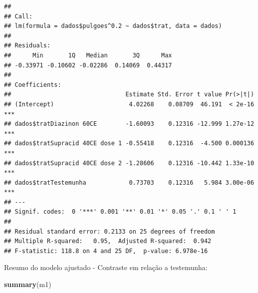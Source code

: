 \documentclass[
]{book}
\newenvironment{Shaded}{\begin{snugshade}}{\end{snugshade}}
\newcommand{\DataTypeTok}[1]{\textcolor[rgb]{0.13,0.29,0.53}{#1}}
\newcommand{\FloatTok}[1]{\textcolor[rgb]{0.00,0.00,0.81}{#1}}
\newcommand{\KeywordTok}[1]{\textcolor[rgb]{0.13,0.29,0.53}{\textbf{#1}}}
\newcommand{\NormalTok}[1]{#1}
\newcommand{\OperatorTok}[1]{\textcolor[rgb]{0.81,0.36,0.00}{\textbf{#1}}}
\newcommand{\StringTok}[1]{\textcolor[rgb]{0.31,0.60,0.02}{#1}}
\begin{document}
\begin{verbatim}
## 
## Call:
## lm(formula = dados$pulgoes^0.2 ~ dados$trat, data = dados)
## 
## Residuals:
##      Min       1Q   Median       3Q      Max 
## -0.33971 -0.10602 -0.02286  0.14069  0.44317 
## 
## Coefficients:
##                                Estimate Std. Error t value Pr(>|t|)    
## (Intercept)                     4.02268    0.08709  46.191  < 2e-16 ***
## dados$tratDiazinon 60CE        -1.60093    0.12316 -12.999 1.27e-12 ***
## dados$tratSupracid 40CE dose 1 -0.55418    0.12316  -4.500 0.000136 ***
## dados$tratSupracid 40CE dose 2 -1.28606    0.12316 -10.442 1.33e-10 ***
## dados$tratTestemunha            0.73703    0.12316   5.984 3.00e-06 ***
## ---
## Signif. codes:  0 '***' 0.001 '**' 0.01 '*' 0.05 '.' 0.1 ' ' 1
## 
## Residual standard error: 0.2133 on 25 degrees of freedom
## Multiple R-squared:   0.95,  Adjusted R-squared:  0.942 
## F-statistic: 118.8 on 4 and 25 DF,  p-value: 6.978e-16
\end{verbatim}

Resumo do modelo ajustado - Contraste em relação a testemunha:

\begin{Shaded}
\end{Shaded}

\begin{Shaded}
\end{Shaded}

\begin{Shaded}
\begin{Highlighting}[]
\KeywordTok{summary}\NormalTok{(m1)}
\end{Highlighting}
\end{Shaded}
\end{document}
